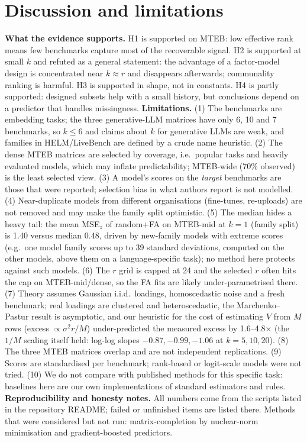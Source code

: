 \documentclass{article}
\begin{document}
\section{Discussion and limitations}\label{sec:disc}
\textbf{What the evidence supports.} H1 is supported on MTEB: low effective rank means few benchmarks capture most of the recoverable signal. H2 is supported at small $k$ and refuted as a general statement: the advantage of a factor-model design is concentrated near $k\approx r$ and disappears afterwards; communality ranking is harmful. H3 is supported in shape, not in constants. H4 is partly supported: designed subsets help with a small history, but conclusions depend on a predictor that handles missingness.
\textbf{Limitations.} (1) The benchmarks are embedding tasks; the three generative-LLM matrices have only 6, 10 and 7 benchmarks, so $k\le6$ and claims about $k$ for generative LLMs are weak, and families in HELM/LiveBench are defined by a crude name heuristic. (2) The dense MTEB matrices are selected by coverage, i.e.\ popular tasks and heavily evaluated models, which may inflate predictability; MTEB-wide (70\% observed) is the least selected view. (3) A model's scores on the \emph{target} benchmarks are those that were reported; selection bias in what authors report is not modelled. (4) Near-duplicate models from different organisations (fine-tunes, re-uploads) are not removed and may make the family split optimistic. (5) The median hides a heavy tail: the mean MSE$_z$ of random+FA on MTEB-mid at $k=1$ (family split) is 1.40 versus median 0.48, driven by new-family models with extreme scores (e.g.\ one model family scores up to 39 standard deviations, computed on the other models, above them on a language-specific task); no method here protects against such models. (6) The $r$ grid is capped at 24 and the selected $r$ often hits the cap on MTEB-mid/dense, so the FA fits are likely under-parametrised there. (7) Theory assumes Gaussian i.i.d.\ loadings, homoscedastic noise and a fresh benchmark; real loadings are clustered and heteroscedastic, the Marchenko--Pastur result is asymptotic, and our heuristic for the cost of estimating $V$ from $M$ rows (excess $\propto\sigma^2r/M$) under-predicted the measured excess by 1.6--4.8$\times$ (the $1/M$ scaling itself held: log-log slopes $-0.87,-0.99,-1.06$ at $k=5,10,20$). (8) The three MTEB matrices overlap and are not independent replications. (9) Scores are standardised per benchmark; rank-based or logit-scale models were not tried. (10) We do not compare with published methods for this specific task: baselines here are our own implementations of standard estimators and rules.
\textbf{Reproducibility and honesty notes.} All numbers come from the scripts listed in the repository README; failed or unfinished items are listed there. Methods that were considered but not run: matrix-completion by nuclear-norm minimisation and gradient-boosted predictors.
\end{document}

